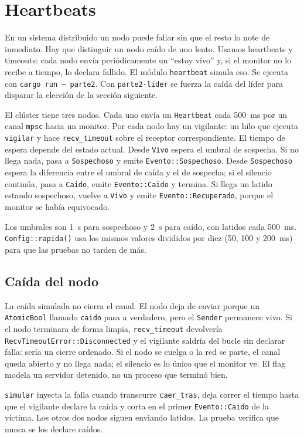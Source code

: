 \section{Heartbeats}

En un sistema distribuido un nodo puede fallar sin que el resto lo note
de inmediato. Hay que distinguir un nodo caído de uno lento. Usamos
heartbeats y timeouts: cada nodo envía periódicamente un ``estoy vivo''
y, si el monitor no lo recibe a tiempo, lo declara fallido. El módulo
\texttt{heartbeat} simula eso. Se ejecuta con
\texttt{cargo run -- parte2}. Con \texttt{parte2-lider} se fuerza la
caída del líder para disparar la elección de la sección siguiente.

El clúster tiene tres nodos. Cada uno envía un \texttt{Heartbeat} cada
500~ms por un canal \texttt{mpsc} hacia un monitor. Por cada nodo hay un
vigilante: un hilo que ejecuta \texttt{vigilar} y hace
\texttt{recv\_timeout} sobre el receptor correspondiente. El tiempo de
espera depende del estado actual. Desde \texttt{Vivo} espera el umbral
de sospecha. Si no llega nada, pasa a \texttt{Sospechoso} y emite
\texttt{Evento::Sospechoso}. Desde \texttt{Sospechoso} espera la
diferencia entre el umbral de caída y el de sospecha; si el silencio
continúa, pasa a \texttt{Caido}, emite \texttt{Evento::Caido} y termina.
Si llega un latido estando sospechoso, vuelve a \texttt{Vivo} y emite
\texttt{Evento::Recuperado}, porque el monitor se había equivocado.

Los umbrales son 1~s para sospechoso y 2~s para caído, con latidos cada
500~ms. \texttt{Config::rapida()} usa los mismos valores divididos por
diez (50, 100 y 200~ms) para que las pruebas no tarden de más.

\subsection{Caída del nodo}

La caída simulada no cierra el canal. El nodo deja de enviar porque un
\texttt{AtomicBool} llamado \texttt{caido} pasa a verdadero, pero el
\texttt{Sender} permanece vivo. Si el nodo terminara de forma limpia,
\texttt{recv\_timeout} devolvería
\texttt{RecvTimeoutError::Disconnected} y el vigilante saldría del bucle
sin declarar falla: sería un cierre ordenado. Si el nodo se cuelga o la
red se parte, el canal queda abierto y no llega nada; el silencio es lo
único que el monitor ve. El flag modela un servidor detenido, no un
proceso que terminó bien.

\texttt{simular} inyecta la falla cuando transcurre \texttt{caer\_tras},
deja correr el tiempo hasta que el vigilante declare la caída y corta en
el primer \texttt{Evento::Caido} de la víctima. Los otros dos nodos
siguen enviando latidos. La prueba verifica que nunca se los declare
caídos.

